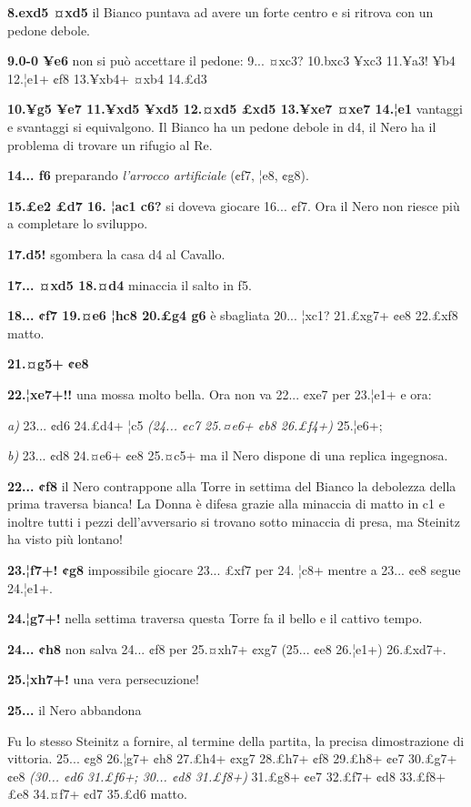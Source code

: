 \textbf{8.exd5 ¤xd5} il Bianco puntava ad avere un forte centro e si
ritrova con un pedone debole.

\textbf{9.0-0 ¥e6} non si può accettare il pedone: 9... ¤xc3? 10.bxc3
¥xc3 11.¥a3! ¥b4 12.¦e1+ ¢f8 13.¥xb4+ ¤xb4 14.£d3

\textbf{10.¥g5 ¥e7 11.¥xd5 ¥xd5 12.¤xd5 £xd5 13.¥xe7 ¤xe7 14.¦e1}
vantaggi e svantaggi si equivalgono. Il Bianco ha un pedone debole in
d4, il Nero ha il problema di trovare un rifugio al Re.

\textbf{14... f6} preparando \emph{l'arrocco artificiale} (¢f7, ¦e8,
¢g8).

\textbf{15.£e2 £d7 16. ¦ac1 c6?} si doveva giocare 16... ¢f7. Ora il
Nero non riesce più a completare lo sviluppo.

\textbf{17.d5!} sgombera la casa d4 al Cavallo.

\textbf{17... ¤xd5 18.¤d4} minaccia il salto in f5.

\textbf{18... ¢f7 19.¤e6 ¦hc8 20.£g4 g6} è sbagliata 20... ¦xc1?
21.£xg7+ ¢e8 22.£xf8 matto.

\textbf{21.¤g5+ ¢e8}


\textbf{22.¦xe7+!!} una mossa molto bella. Ora non va 22... ¢xe7 per
23.¦e1+ e ora:

\emph{a)} 23... ¢d6 24.£d4+ ¦c5 \emph{(24... ¢c7 25.¤e6+ ¢b8 26.£f4+)}
25.¦e6+;

\emph{b)} 23... ¢d8 24.¤e6+ ¢e8 25.¤c5+ ma il Nero dispone di una
replica ingegnosa.

\textbf{22... ¢f8} il Nero contrappone alla Torre in settima del Bianco
la debolezza della prima traversa bianca! La Donna è difesa grazie alla
minaccia di matto in c1 e inoltre tutti i pezzi dell'avversario si
trovano sotto minaccia di presa, ma Steinitz ha visto più lontano!

\textbf{23.¦f7+! ¢g8} impossibile giocare 23... £xf7 per 24. ¦c8+ mentre
a 23... ¢e8 segue 24.¦e1+.

\textbf{24.¦g7+!} nella settima traversa questa Torre fa il bello e il
cattivo tempo.

\textbf{24... ¢h8} non salva 24... ¢f8 per 25.¤xh7+ ¢xg7 (25... ¢e8
26.¦e1+) 26.£xd7+.

\textbf{25.¦xh7+!} una vera persecuzione!

\textbf{25...} il Nero abbandona

Fu lo stesso Steinitz a fornire, al termine della partita, la precisa
dimostrazione di vittoria. 25... ¢g8 26.¦g7+ ¢h8 27.£h4+ ¢xg7 28.£h7+
¢f8 29.£h8+ ¢e7 30.£g7+ ¢e8 \emph{(30... ¢d6 31.£f6+; 30... ¢d8
31.£f8+)} 31.£g8+ ¢e7 32.£f7+ ¢d8 33.£f8+ £e8 34.¤f7+ ¢d7 35.£d6 matto.

